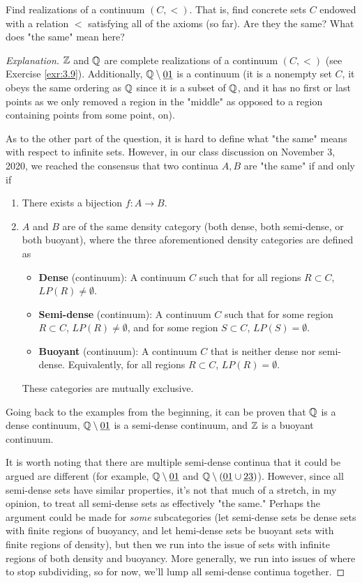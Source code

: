 \documentclass[../main.tex]{subfiles}
\begin{document}
\begin{exercise}\label{exr:3.27}
    Find realizations of a continuum $(C,<)$. That is, find concrete sets $C$ endowed with a relation $<$ satisfying all of the axioms (so far). Are they the same? What does "the same" mean here?
    \begin{proof}[Explanation]
        $\mathbb{Z}$ and $\mathbb{Q}$ are complete realizations of a continuum $(C,<)$ (see Exercise \ref{exr:3.9}). Additionally, $\mathbb{Q}\setminus\underline{01}$ is a continuum (it is a nonempty set $C$, it obeys the same ordering as $\mathbb{Q}$ since it is a subset of $\mathbb{Q}$, and it has no first or last points as we only removed a region in the "middle" as opposed to a region containing points from some point, on).\par
        As to the other part of the question, it is hard to define what "the same" means with respect to infinite sets. However, in our class discussion on November 3, 2020, we reached the consensus that two continua $A,B$ are "the same" if and only if
        \begin{enumerate}
            \item There exists a bijection $f:A\to B$.
            \item $A$ and $B$ are of the same density category (both dense, both semi-dense, or both buoyant), where the three aforementioned density categories are defined as
            \begin{itemize}
                \item \textbf{Dense} (continuum): A continuum $C$ such that for all regions $R\subset C$, $LP(R)\neq\emptyset$.
                \item \textbf{Semi-dense} (continuum): A continuum $C$ such that for some region $R\subset C$, $LP(R)\neq\emptyset$, and for some region $S\subset C$, $LP(S)=\emptyset$.
                \item \textbf{Buoyant} (continuum): A continuum $C$ that is neither dense nor semi-dense. Equivalently, for all regions $R\subset C$, $LP(R)=\emptyset$.
            \end{itemize}
            These categories are mutually exclusive.
        \end{enumerate}
        Going back to the examples from the beginning, it can be proven that $\mathbb{Q}$ is a dense continuum, $\mathbb{Q}\setminus\underline{01}$ is a semi-dense continuum, and $\mathbb{Z}$ is a buoyant continuum.\par
        It is worth noting that there are multiple semi-dense continua that it could be argued are different (for example, $\mathbb{Q}\setminus\underline{01}$ and $\mathbb{Q}\setminus(\underline{01}\cup\underline{23})$). However, since all semi-dense sets have similar properties, it's not that much of a stretch, in my opinion, to treat all semi-dense sets as effectively "the same." Perhaps the argument could be made for \emph{some} subcategories (let semi-dense sets be dense sets with finite regions of buoyancy, and let hemi-dense sets be buoyant sets with finite regions of density), but then we run into the issue of sets with infinite regions of both density and buoyancy. More generally, we run into issues of where to stop subdividing, so for now, we'll lump all semi-dense continua together.
    \end{proof}
\end{exercise}
\end{document}
